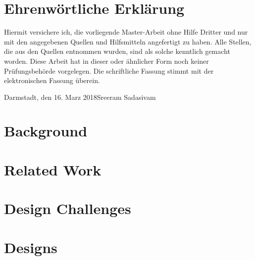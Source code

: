 \documentclass[longdoc,accentcolor=tud1b,12pt,paper=a4]{tudreport}
\title{\deedsTitle}
\subtitle{\deedsThesisType}
\newcounter{dummy} %
\newcommand{\deedsThesisType}{Master-Arbeit\xspace} %
\newcommand{\deedsName}{Sreeram Sadasivam\xspace}
\newcommand{\deedsSubmissionDate}{16. Marz 2018\xspace}%
\begin{document}
	\frenchspacing
	\raggedbottom
	\maketitle
	
	\chapter*{Ehrenw\"ortliche Erkl\"arung}
	Hiermit versichere ich, die vorliegende \deedsThesisType ohne Hilfe Dritter und nur mit den angegebenen Quellen
    und Hilfsmitteln angefertigt zu haben. Alle Stellen, die aus den Quellen entnommen wurden, sind als solche
    kenntlich gemacht worden. Diese Arbeit hat in dieser oder \"ahnlicher Form noch keiner Pr\"ufungsbeh\"orde vorgelegen.
    Die schriftliche Fassung stimmt mit der elektronischen Fassung \"uberein.
    
	
	\vspace{1.5cm}
	
	\noindent Darmstadt, den \deedsSubmissionDate\hfill \deedsName
	
	\tableofcontents
	\listoffigures
	\listoftables

	\begin{abstract}
	Abstract comes here...
	\end{abstract}		
	
	
	\cleardoublepage
	\chapter{Background}
	
	
	\chapter{Related Work}
	
	
	\chapter{Design Challenges}
		
	
	\chapter{Designs}
	
	
\end{document}
